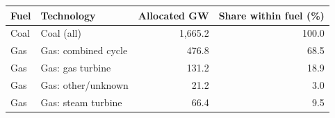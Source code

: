 \begin{tabular}{llrr}
\toprule
Fuel & Technology & Allocated GW & Share within fuel (\%) \\
\midrule
Coal & Coal (all) & 1,665.2 & 100.0 \\
Gas & Gas: combined cycle & 476.8 & 68.5 \\
Gas & Gas: gas turbine & 131.2 & 18.9 \\
Gas & Gas: other/unknown & 21.2 & 3.0 \\
Gas & Gas: steam turbine & 66.4 & 9.5 \\
\bottomrule
\end{tabular}
